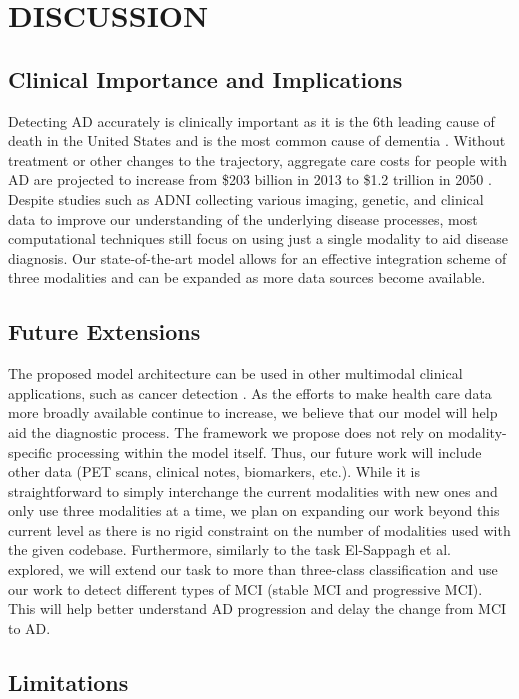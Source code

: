 \documentclass[11pt]{article}
\begin{document}
\section*{DISCUSSION}
\subsection*{Clinical Importance and Implications}
Detecting AD accurately is clinically important as it is the 6th leading cause of death in the United States and is the most common cause of dementia \cite{naqvi_2017}. Without treatment or other changes to the trajectory, aggregate care costs for people with AD are projected to increase from \$203 billion in 2013 to \$1.2 trillion in 2050 \cite{thies_bleiler_2013}.
Despite studies such as ADNI collecting various imaging, genetic, and clinical data to improve our understanding of the underlying disease processes, most computational techniques still focus on using just a single modality to aid disease diagnosis. Our state-of-the-art model allows for an effective integration scheme of three modalities and can be expanded as more data sources become available. 

\subsection*{Future Extensions}
The proposed model architecture can be used in other multimodal clinical applications, such as cancer detection \cite{esteva2017dermatologist, weng2017combining}. As the efforts to make health care data more broadly available continue to increase, we believe that our model will help aid the diagnostic process. The framework we propose does not rely on modality-specific processing within the model itself. Thus, our future work will include other data (PET scans, clinical notes, biomarkers, etc.). While it is straightforward to simply interchange the current modalities with new ones and only use three modalities at a time, we plan on expanding our work beyond this current level as there is no rigid constraint on the number of modalities used with the given codebase. 
Furthermore, similarly to the task El-Sappagh et al.\ \cite{ELSAPPAGH2020197} explored, we will extend our task to more than three-class classification and use our work to detect different types of MCI (stable MCI and progressive MCI). This will help better understand AD progression and delay the change from MCI to AD.

\subsection*{Limitations}
\end{document}
